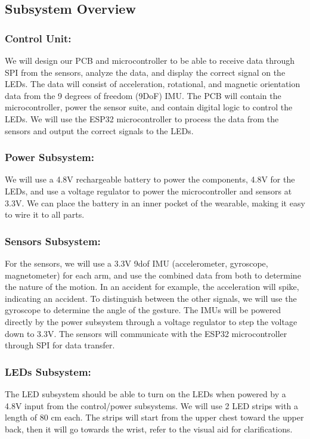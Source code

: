 \documentclass[12pt]{article}
\begin{document}
\subsection{Subsystem Overview}
    \subsubsection{Control Unit:} 
    We will design our PCB and microcontroller to be able to 
    receive data through SPI from the sensors, analyze the data, 
    and display the correct signal on the LEDs. The data will 
    consist of acceleration, rotational, and magnetic orientation
    data from the 9 degrees of freedom (9DoF) IMU. The PCB will 
    contain the microcontroller, power the sensor suite, and 
    contain digital logic to control the LEDs. We will use the 
    ESP32 microcontroller \cite{EspressifESP32} to process the data from the sensors 
    and output the correct signals to the LEDs. 
    \subsubsection{Power Subsystem:} 
	We will use a 4.8V rechargeable battery to power the components, 4.8V for the LEDs, and use a voltage regulator \cite{DiodesIncorporatedAP2112} to power the microcontroller and sensors at 3.3V. We can place the battery in an inner pocket of the wearable, making it easy to wire it to all parts. 
    \subsubsection{Sensors Subsystem:} 
    For the sensors, we will use a 3.3V 9dof IMU (accelerometer, 
    gyroscope, magnetometer) \cite{STMicroelectronics2015LSM9DS1} for each arm, and use the combined 
    data from both to determine the nature of the motion. In an 
    accident for example, the acceleration will spike, indicating 
    an accident. To distinguish between the other signals, we will
     use the gyroscope to determine the angle of the gesture. The 
     IMUs will be powered directly by the power subsystem through 
     a voltage regulator to step the voltage down to 3.3V. The 
     sensors will communicate with the ESP32 microcontroller 
     through SPI for data transfer. 
    \subsubsection{LEDs Subsystem:} 
    The LED subsystem should be able to turn on the LEDs when powered by a 4.8V input from the control/power subsystems. We will use 2 LED strips with a length of 80 cm each. The strips will start from the upper chest toward the upper back, then it will go towards the wrist, refer to the visual aid for clarifications. 
\end{document}

